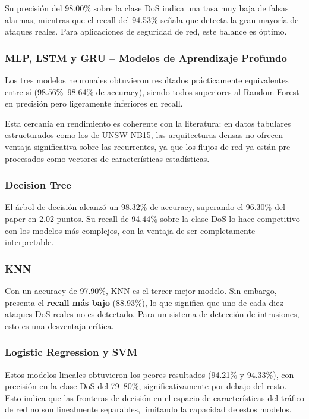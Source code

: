 \documentclass[12pt,a4paper]{article}
\begin{document}
Su precisión del 98.00\% sobre la clase DoS indica una tasa muy baja de falsas alarmas,
mientras que el recall del 94.53\% señala que detecta la gran mayoría de ataques reales.
Para aplicaciones de seguridad de red, este balance es óptimo.

\subsubsection{MLP, LSTM y GRU -- Modelos de Aprendizaje Profundo}
Los tres modelos neuronales obtuvieron resultados prácticamente equivalentes entre sí
(98.56\%--98.64\% de accuracy), siendo todos superiores al Random Forest en precisión
pero ligeramente inferiores en recall.

Esta cercanía en rendimiento es coherente con la literatura: en datos tabulares estructurados
como los de UNSW-NB15, las arquitecturas densas no ofrecen ventaja significativa sobre las
recurrentes, ya que los flujos de red ya están pre-procesados como vectores de características
estadísticas.

\subsubsection{Decision Tree}
El árbol de decisión alcanzó un 98.32\% de accuracy, superando el 96.30\% del paper
en 2.02 puntos. Su recall de 94.44\% sobre la clase DoS lo hace competitivo con los
modelos más complejos, con la ventaja de ser completamente interpretable.

\subsubsection{KNN}
Con un accuracy de 97.90\%, KNN es el tercer mejor modelo. Sin embargo, presenta el
\textbf{recall más bajo} (88.93\%), lo que significa que uno de cada diez ataques DoS
reales no es detectado. Para un sistema de detección de intrusiones, esto es una
desventaja crítica.

\subsubsection{Logistic Regression y SVM}
Estos modelos lineales obtuvieron los peores resultados (94.21\% y 94.33\%),
con precisión en la clase DoS del 79--80\%, significativamente por debajo del resto.
Esto indica que las fronteras de decisión en el espacio de características del
tráfico de red no son linealmente separables, limitando la capacidad de estos modelos.
\end{document}
